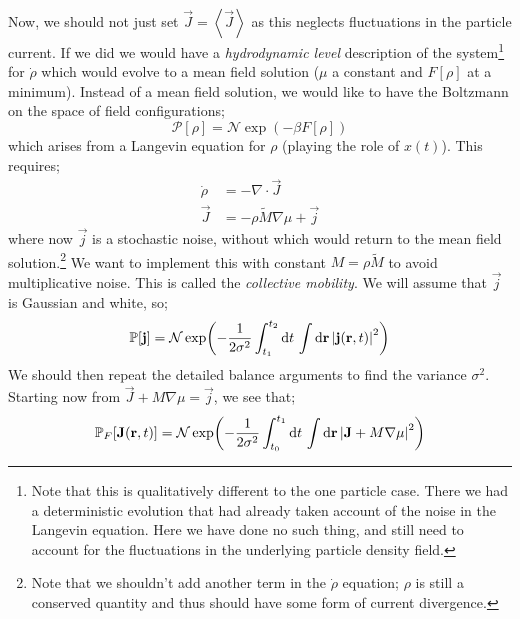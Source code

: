 \paraskip
Now, we should not just set $\vec{J} = \left< \vec{J} \right>$ as this neglects fluctuations in the particle current. If we did we would have a \emph{hydrodynamic level} description of the system\footnote{Note that this is qualitatively different to the one particle case. There we had a deterministic evolution that had already taken account of the noise in the Langevin equation. Here we have done no such thing, and still need to account for the fluctuations in the underlying particle density field.} for $\dot{\rho}$ which would evolve to a mean field solution ($\mu$ a constant and $F[\rho]$ at a minimum). Instead of a mean field solution, we would like to have the Boltzmann on the space of field configurations;
\begin{equation}
\mathcal{P}[\rho] = \mathcal{N}\exp\left(-\beta F[\rho]\right)
\end{equation}
which arises from a Langevin equation for $\rho$ (playing the role of $x(t)$). This requires;
\begin{align}
\dot{\rho} &= -\nabla \cdot \vec{J} \\
\vec{J} &= -\rho \tilde{M} \nabla\mu + \vec{j}
\end{align} 
where now $\vec{j}$ is a stochastic noise, without which would return to the mean field solution.\footnote{Note that we shouldn't add another term in the $\dot{\rho}$ equation; $\rho$ is still a conserved quantity and thus should have some form of current divergence.} We want to implement this with constant $M = \rho \tilde{M}$ to avoid multiplicative noise. This is called the \emph{collective mobility}. We will assume that $\vec{j}$ is Gaussian and white\footnotemark, so;
\begin{equation}
\mathbb{P}[\vec{j}] = \mathcal{N}\exp\left(-\frac{1}{2\sigma^2}\int_{t_1}^{t_2}{\upd{t}\int{\upd{\vec{r}}\abs{\vec{j}(\vec{r}, t)}^2}}\right)
\end{equation}  
We should then repeat the detailed balance arguments to find the variance $\sigma^2$. Starting now from $\vec{J} + M\nabla \mu = \vec{j}$, we see that;
\begin{equation}
\mathbb{P}_F[\vec{J}(\vec{r}, t)] = \mathcal{N}\exp\left(-\frac{1}{2\sigma^2}\int_{t_0}^{t_1}{\upd{t}\int{\upd{\vec{r}}\abs{\vec{J} + M\nabla\mu}^2}}\right)
\end{equation} 

